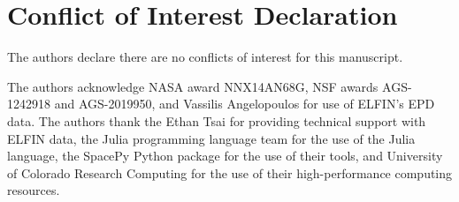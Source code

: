 \documentclass[draft]{agujournal2019}
\begin{document}
\section*{Conflict of Interest Declaration}
The authors declare there are no conflicts of interest for this manuscript.

\acknowledgments
The authors acknowledge NASA award NNX14AN68G, NSF awards AGS-1242918 and AGS-2019950, and Vassilis Angelopoulos for use of ELFIN's EPD data. The authors thank the Ethan Tsai for providing technical support with ELFIN data, the Julia programming language team \cite{julia-language} for the use of the Julia language, the SpacePy Python package \cite{spacepy2, spacepy1} for the use of their tools, and University of Colorado Research Computing for the use of their high-performance computing resources.

%

%
\end{document}
